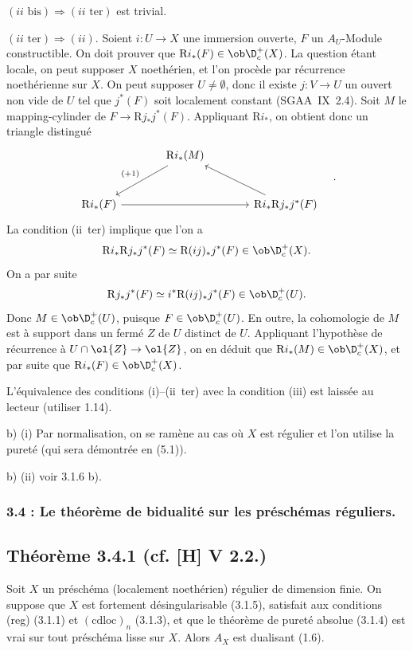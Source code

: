 $(ii\text{~bis}) \Rightarrow (ii\text{~ter})$ est trivial.

$(ii\text{~ter}) \Rightarrow (ii)$. Soient $i : U \to X$ une immersion ouverte, $F$ un $A_U$-Module constructible. On doit prouver que $\mathrm{R} i_{*}(F) \in \ob \D_c^{+}(X)$. La question étant locale, on peut supposer $X$ noethérien, et l'on procède par récurrence noethérienne sur $X$. On peut supposer $U \neq \emptyset$, donc il existe 
$j : V \to U$ un
ouvert non vide de $U$ tel que $j^{*}(F)$ soit localement constant (SGAA~IX~2.4). Soit $M$ le mapping-cylinder de $F \to \mathrm{R} j_{*}j^{*}(F)$. Appliquant $\mathrm{R} i_{*}$, on obtient donc un triangle distingué
\[
\begin{tikzcd}[column sep=large,row sep=large]
& \mathrm{R} i_{*}(M) \arrow[dl,"{(+1)}"'] & \\
\mathrm{R} i_{*}(F) \arrow[rr] & & \mathrm{R} i_{*}\mathrm{R} j_{*}j^{*}(F) \arrow[ul]
\end{tikzcd}\quad .
\]
La condition (ii~ter) implique que l'on a
\[
\mathrm{R} i_{*} \mathrm{R} j_{*} j^{*}(F) \simeq \mathrm{R}(ij)_{*} j^{*}(F) \in \ob \D_c^{+}(X).
\]
On a par suite
\[
\mathrm{R} j_{*}j^{*}(F) \simeq i^{*} \mathrm{R}(ij)_{*} j^{*}(F) \in \ob \D_c^{+}(U).
\]
Donc $M \in \ob \D_c^{+}(U)$, puisque $F \in \ob \D_c^{+}(U)$. En outre, la cohomologie de $M$ est à support dans un fermé $Z$ de $U$ distinct de $U$. Appliquant l'hypothèse de récurrence à $U \cap \ol{Z} \to \ol{Z}$, on en déduit que $\mathrm{R} i_{*}(M) \in \ob \D_c^{+}(X)$, et par suite que $\mathrm{R} i_{*}(F) \in \ob \D_c^{+}(X)$.

L'équivalence des conditions (i)--(ii~ter) avec la condition (iii) est laissée au lecteur (utiliser 1.14).

b) (i) Par normalisation, on se ramène au cas où $X$ est régulier et l'on utilise la pureté (qui sera démontrée en (5.1)).

b) (ii) voir 3.1.6 b).

\subsubsection*{3.4 : Le théorème de bidualité sur les préschémas réguliers.}

\subsection*{Théorème 3.4.1 (cf. [H] V 2.2.)}
Soit $X$ un préschéma (localement noethérien) régulier de dimension finie. On suppose que $X$ est fortement désingularisable (3.1.5), satisfait aux conditions (reg) (3.1.1) et $(\mathrm{cdloc})_n$ (3.1.3), et que le théorème de pureté absolue (3.1.4) est vrai sur tout préschéma lisse sur $X$. Alors $A_X$ est dualisant (1.6).

